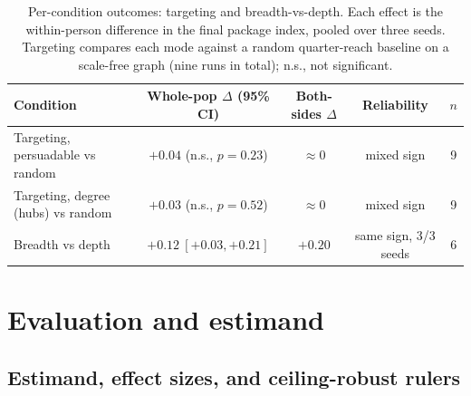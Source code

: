 \documentclass[pdflatex,sn-mathphys-num]{sn-jnl}%
\theoremstyle{thmstyleone}%
\theoremstyle{thmstyletwo}%
\theoremstyle{thmstylethree}%
\begin{document}
\begin{table}[t]
  \centering
  \footnotesize
  \caption{Per-condition outcomes: targeting and breadth-vs-depth. Each effect is
  the within-person difference in the final package index, pooled over three seeds.
  Targeting compares each mode against a random quarter-reach baseline on a
  scale-free graph (nine runs in total); n.s., not significant.}
  \label{tab:si-outcomes-target-iso}
  \begin{tabular}{@{}lcccc@{}}
    \toprule
    Condition & Whole-pop $\Delta$ (95\% CI) & Both-sides $\Delta$ & Reliability & $n$ \\
    \midrule
    Targeting, persuadable vs random & $+0.04$ (n.s., $p=0.23$) & $\approx 0$ & mixed sign & 9 \\
    Targeting, degree (hubs) vs random & $+0.03$ (n.s., $p=0.52$) & $\approx 0$ & mixed sign & 9 \\
    Breadth vs depth & $+0.12\ [+0.03, +0.21]$ & $+0.20$ & same sign, 3/3 seeds & 6 \\
    \bottomrule
  \end{tabular}
\end{table}


\section{Evaluation and estimand}\label{sec:si-evaluation}

\subsection{Estimand, effect sizes, and ceiling-robust rulers}\label{subsec:si-estimand}
\end{document}
